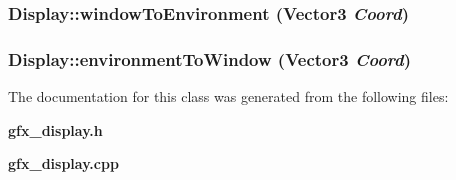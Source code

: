 \subsubsection{ Display::windowToEnvironment ({\bf Vector3} {\em Coord})}\label{classEngine_1_1Display_f3c72ae4868a704fc576488b4e7d34a5}


\subsubsection{ Display::environmentToWindow ({\bf Vector3} {\em Coord})}\label{classEngine_1_1Display_10994c7db2d8d27c58c70681beefd062}




The documentation for this class was generated from the following files:\begin{CompactItemize}
\item 
{\bf gfx\_\-display.h}\item 
{\bf gfx\_\-display.cpp}\end{CompactItemize}
